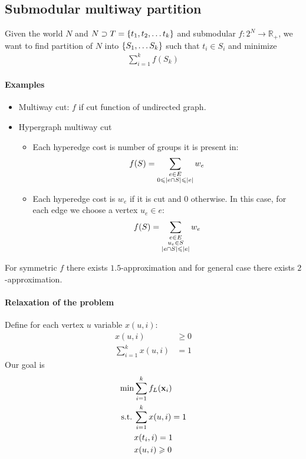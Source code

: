 \subsection{Submodular multiway partition}
Given the world $N$ and $N\supset T = \qty{t_1, t_2,\dots t_k}$ and submodular $f:2^N \to \mathbb{R}_+$, we want to find partition of $N$ into $\qty{S_1, \dots S_k}$ such that $t_i\in S_i$ and minimize
\begin{align}
\sum_{i=1}^k f(S_k)
\end{align}
\paragraph{Examples}
\begin{itemize}
	\item Multiway cut: $f$ if cut function of undirected graph. 
	\item Hypergraph multiway cut
	\begin{itemize}
		\item Each hyperedge cost is number of groups it is present in:
		\begin{align}
		f(S) = \sum_{\substack{e \in E\\0\leqslant\abs{e\cap S} \leqslant \abs{e}}} w_e
		\end{align}
		\item Each hyperedge cost is $w_e$ if it is cut and $0$ otherwise. In this case, for each edge we choose a vertex $u_e\in e$:
		\begin{align}
		f(S) = \sum_{\substack{e \in E\\u_e\in S\\\abs{e\cap S} \leqslant \abs{e}}} w_e
		\end{align}
	\end{itemize}
\end{itemize}

For symmetric $f$ there exists $1.5$-approximation and for general case there exists $2$-approximation.

\paragraph{Relaxation of the problem}
Define for each vertex $u$ variable $x(u,i)$:
\begin{align}
	x(u,i) &\geqslant 0\\
	\sum_{i=1}^k x(u,i) &= 1
\end{align}
Our goal is
\begin{align}
\min &\sum_{i=1}^k f_L(\vb{x}_i)\\
\text{s.t.} \: & \sum_{i=1}^k x(u,i) = 1\\
& x(t_i,i) = 1\\
& x(u,i) \geqslant 0
\end{align}


